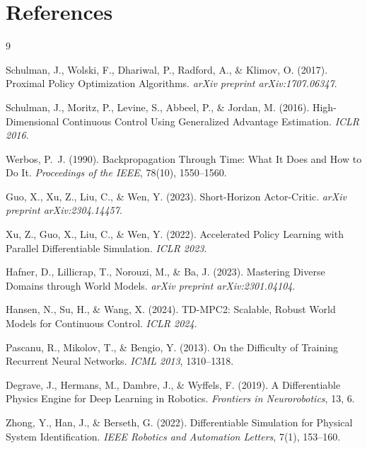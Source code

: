 \documentclass[11pt,a4paper]{article}
\begin{document}
\begin{enumerate}
\end{enumerate}

\section*{References}
\label{sec:references}

\begin{thebibliography}{9}

  Schulman, J., Wolski, F., Dhariwal, P., Radford, A., \& Klimov, O. (2017).
  Proximal Policy Optimization Algorithms.
  \textit{arXiv preprint arXiv:1707.06347}.

  Schulman, J., Moritz, P., Levine, S., Abbeel, P., \& Jordan, M. (2016).
  High-Dimensional Continuous Control Using Generalized Advantage Estimation.
  \textit{ICLR 2016}.

  Werbos, P.~J. (1990).
  Backpropagation Through Time: What It Does and How to Do It.
  \textit{Proceedings of the IEEE}, 78(10), 1550--1560.

  Guo, X., Xu, Z., Liu, C., \& Wen, Y. (2023).
  Short-Horizon Actor-Critic.
  \textit{arXiv preprint arXiv:2304.14457}.

  Xu, Z., Guo, X., Liu, C., \& Wen, Y. (2022).
  Accelerated Policy Learning with Parallel Differentiable Simulation.
  \textit{ICLR 2023}.

  Hafner, D., Lillicrap, T., Norouzi, M., \& Ba, J. (2023).
  Mastering Diverse Domains through World Models.
  \textit{arXiv preprint arXiv:2301.04104}.

  Hansen, N., Su, H., \& Wang, X. (2024).
  TD-MPC2: Scalable, Robust World Models for Continuous Control.
  \textit{ICLR 2024}.

  Pascanu, R., Mikolov, T., \& Bengio, Y. (2013).
  On the Difficulty of Training Recurrent Neural Networks.
  \textit{ICML 2013}, 1310--1318.

  Degrave, J., Hermans, M., Dambre, J., \& Wyffels, F. (2019).
  A Differentiable Physics Engine for Deep Learning in Robotics.
  \textit{Frontiers in Neurorobotics}, 13, 6.

  Zhong, Y., Han, J., \& Berseth, G. (2022).
  Differentiable Simulation for Physical System Identification.
  \textit{IEEE Robotics and Automation Letters}, 7(1), 153--160.


\end{thebibliography}
\end{document}
